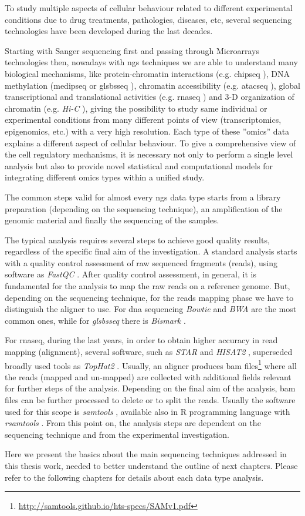 To study multiple aspects of cellular behaviour related to different experimental conditions due to drug treatments, pathologies, diseases, etc, several sequencing technologies have been developed during the last decades.

Starting with Sanger sequencing first and passing through Microarrays technologies then, nowadays with \gls{ngs} techniques we are able to understand many biological mechanisms, like protein-chromatin interactions (e.g. \gls{chipseq} \cite{Park2009}), DNA methylation (\gls{medipseq} or gls{bsseq} \cite{Frommer1992}), chromatin accessibility (e.g. \gls{atacseq} \cite{Buenrostro2013}), global transcriptional and translational activities (e.g. \gls{rnaseq} \cite{Wang2009}) and 3-D organization of chromatin (e.g. \textit{Hi-C} \cite{VanBerkum2010}), giving the possibility to study same individual or experimental conditions from many different points of view (transcriptomics, epigenomics, etc.) with a very high resolution. Each type of these ''omics'' data explains a different aspect of cellular behaviour. 
To give a comprehensive view of the cell regulatory mechanisms, it is necessary not only to perform a single level analysis but also to provide novel statistical and computational models for integrating different omics types within a unified study.

The common steps valid for almost every \gls{ngs} data type starts from a library preparation (depending on the sequencing technique), an amplification of the genomic material and finally the sequencing of the samples.

The typical analysis requires several steps to achieve good quality results, regardless of the specific final aim of the investigation.
A standard analysis starts with a quality control assessment of raw sequenced fragments (reads), using software as \textit{FastQC} \cite{Andrews2010}.
After quality control assessment, in general, it is fundamental for the analysis to map the raw reads on a reference genome. 
But, depending on the sequencing technique, for the reads mapping phase we have to distinguish the aligner to use.
For \gls{dna} sequencing \textit{Bowtie} \cite{Langmead2009, Langmead2012} and \textit{BWA} \cite{Li2010, Li2009b} are the most common ones, while for \textit{gls{bsseq}} there is \textit{Bismark} \cite{Krueger2011}.

For \gls{rnaseq}, during the last years, in order to obtain higher accuracy in read mapping (alignment), several software, such as \textit{STAR} \cite{Dobin2013} and \textit{HISAT2} \cite{Kim2015}, superseded broadly used tools as \textit{TopHat2} \cite{Kim2013}.
Usually, an aligner produces \gls{bam} files\footnote{\url{http://samtools.github.io/hts-specs/SAMv1.pdf}} \cite{Li2009} where all the reads (mapped and un-mapped) are collected with additional fields relevant for further steps of the analysis.
Depending on the final aim of the analysis, \gls{bam} files can be further processed to delete or to split the reads. 
Usually the software used for this scope is \textit{samtools} \cite{Li2009, Li2011}, available also in R programming language with \textit{rsamtools} \cite{Morgan}.
From this point on, the analysis steps are dependent on the sequencing technique and from the experimental investigation.

Here we present the basics about the main sequencing techniques addressed in this thesis work, needed to better understand the outline of next chapters.
Please refer to the following chapters for details about each data type analysis.